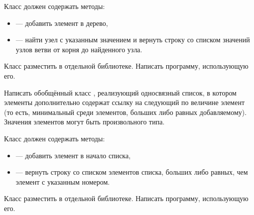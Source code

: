 Класс должен содержать методы:
\begin{itemize}
\item {} — добавить элемент в дерево,
\item {} — найти узел с указанным значением и вернуть
  строку со списком значений узлов ветви от корня до найденного узла.
\end{itemize}

Класс разместить в отдельной библиотеке. Написать программу,
использующую его.

\task Написать обобщённый класс , реализующий
односвязный список, в котором элементы дополнительно содержат ссылку на
следующий по величине элемент (то есть, минимальный среди элементов,
больших либо равных добавляемому). Значения элементов могут быть
произвольного типа.

Класс должен содержать методы:
\begin{itemize}
\item {} — добавить элемент в начало списка,
\item {} — вернуть строку со списком элементов списка,
  больших либо равных, чем элемент с указанным номером.
\end{itemize}

Класс разместить в отдельной библиотеке. Написать программу,
использующую его.
